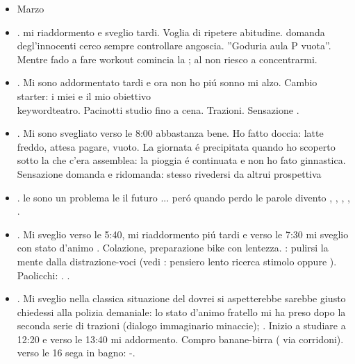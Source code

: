 \begin{itemize}
\item Marzo

\item {}. mi riaddormento e sveglio tardi. Voglia di ripetere abitudine. domanda degl'innocenti cerco sempre controllare angoscia. ''Goduria aula P vuota''. Mentre fado a fare workout comincia la ; al  non riesco a concentrarmi.

\item {}. Mi sono addormentato tardi e ora non ho pi\'u sonno mi alzo. Cambio starter:  i miei  e il mio obiettivo \\keyword{teatro}. Pacinotti studio fino a cena. Trazioni. Sensazione .

\item {}. Mi sono svegliato verso le 8:00 abbastanza bene. Ho fatto doccia: latte freddo, attesa pagare, vuoto. La giornata \'e precipitata quando ho scoperto sotto la  che c'era assemblea: la pioggia \'e continuata e non ho fato ginnastica. Sensazione domanda e ridomanda:  stesso rivedersi da altrui prospettiva

\item {}. le  sono un problema le  il futuro ... per\'o quando perdo le parole divento , , , , .

\item {}. Mi sveglio verso le 5:40, mi riaddormento pi\'u tardi e verso le 7:30 mi sveglio con stato d'animo . Colazione, preparazione bike con lentezza. : pulirsi la mente dalla distrazione-voci (vedi : pensiero lento ricerca stimolo oppure  ). Paolicchi:  . .

\item {}. Mi sveglio nella classica situazione del dovrei si aspetterebbe sarebbe giusto chiedessi alla polizia demaniale: lo stato d'animo fratello mi ha preso dopo la seconda serie di trazioni (dialogo immaginario minaccie); . Inizio a studiare a 12:20 e verso le 13:40 mi addormento. Compro banane-birra ( via corridoni). verso le 16 sega in bagno: -.


\end{itemize}
